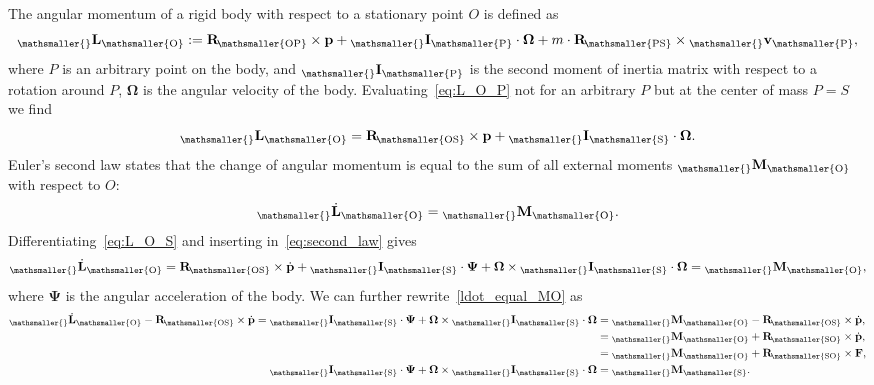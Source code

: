\documentclass[10pt,a4paper,fleqn]{article}
\newcommand{\bVec}[1]{\mathbf{#1}}
\newcommand{\vect}[3]{{_{\mathsmaller{\mathrm{#2}}}\mathbf{#1}_{\mathsmaller{\mathrm{#3}}}}} %
\newcommand{\vectdot}[3]{{_{\mathsmaller{\mathrm{#2}}}\dot{\mathbf{#1}}_{\mathsmaller{\mathrm{#3}}}}} %
\newcommand{\ori}[1]{\bVec{R}_{\!\mathsmaller{\mathrm{#1}}}} %
\begin{document}
The angular momentum of a rigid body with respect to a stationary point $O$ is defined as 
%
\begin{equation}
	\vect{L}{}{O} :=   \ori{OP} \times   \bVec{p} + \vect{I}{}{P} \cdot   \bVec{\Omega} + m \cdot   \ori{PS}\times \vect{v}{}{P},
	\label{eq:L_O_P}
\end{equation}
%
where $P$ is an arbitrary point on the body, and $\vect{I}{}{P}$ is the second moment of inertia matrix with respect to a rotation around $P$, $\bVec{\Omega} $ is the angular velocity of the body.
Evaluating~\eqref{eq:L_O_P} not for an arbitrary $P$ but at the center of mass $P=S$ we find
%
\begin{equation}
	\vect{L}{}{O} =   \ori{OS} \times    \bVec{p} +  \vect{I}{}{S} \cdot  \bVec{\Omega}.
	\label{eq:L_O_S}
\end{equation}
%
Euler's second law states that the change of angular momentum is equal to the sum of all external moments $\vect{M}{}{O}$ with respect to $O$:
% 
\begin{equation}
	\vectdot{L}{}{O} = \vect{M}{}{O}.
	\label{eq:second_law}
\end{equation}
%
Differentiating~\eqref{eq:L_O_S} and inserting in~\eqref{eq:second_law} gives
%
\begin{equation}
	\vectdot{L}{}{O} = \ori{OS}\times  \dot{\bVec{p}} + \vect{I}{}{S} \cdot   \bVec{\Psi} + \bVec\Omega \times   \vect{I}{}{S} \cdot   \bVec{\Omega}  =   \vect{M}{}{O},
	\label{ldot_equal_MO}
\end{equation}
%
where $\bVec{\Psi}$ is the angular acceleration of the body.
We can further rewrite~\eqref{ldot_equal_MO} as
%
\begin{align}
  \vectdot{L}{}{O} -   \ori{OS}\times  \dot{\bVec{p}} = 
  \vect{I}{}{S} \cdot   \bVec{\Psi} + 
  \bVec\Omega \times   \vect{I}{}{S} \cdot   \bVec{\Omega} & = 
  \vect{M}{}{O}-   \ori{OS}\times  \dot{\bVec{p}}, \nonumber\\
& = 
  \vect{M}{}{O} +   \ori{SO}\times  \dot{\bVec{p}}, \nonumber\\
& = 
  \vect{M}{}{O} +   \ori{SO}\times  \bVec{F}, \nonumber\\
  \vect{I}{}{S} \cdot   \bVec{\Psi} + 
  \bVec\Omega \times   \vect{I}{}{S} \cdot   \bVec{\Omega} & = 
  \vect{M}{}{S}.
	\label{eq:ldot_equal_MS}
\end{align}
\end{document}

